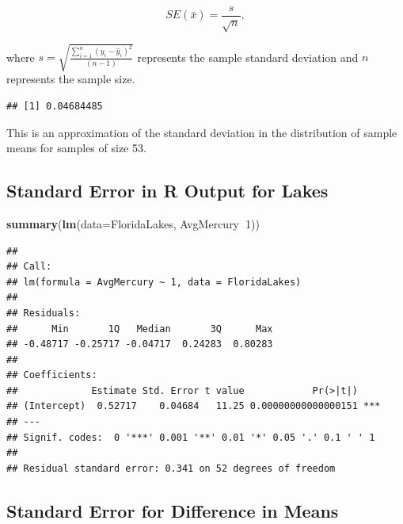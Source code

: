 \documentclass[]{book}
\newenvironment{Shaded}{\begin{snugshade}}{\end{snugshade}}
\newcommand{\KeywordTok}[1]{\textcolor[rgb]{0.13,0.29,0.53}{\textbf{#1}}}
\newcommand{\DataTypeTok}[1]{\textcolor[rgb]{0.13,0.29,0.53}{#1}}
\newcommand{\DecValTok}[1]{\textcolor[rgb]{0.00,0.00,0.81}{#1}}
\newcommand{\OperatorTok}[1]{\textcolor[rgb]{0.81,0.36,0.00}{\textbf{#1}}}
\newcommand{\NormalTok}[1]{#1}
\begin{document}
\[
SE(\bar{x})=\frac{s}{\sqrt{n}}, 
\]

where
\(s=\sqrt{\frac{\displaystyle\sum_{i=1}^n(y_i-\hat{y}_i)^2}{(n-1)}}\)
represents the sample standard deviation and \(n\) represents the sample
size.

\begin{Shaded}
\end{Shaded}

\begin{verbatim}
## [1] 0.04684485
\end{verbatim}

This is an approximation of the standard deviation in the distribution
of sample means for samples of size 53.

\subsection{Standard Error in R Output for
Lakes}\label{standard-error-in-r-output-for-lakes}

\begin{Shaded}
\begin{Highlighting}[]
\KeywordTok{summary}\NormalTok{(}\KeywordTok{lm}\NormalTok{(}\DataTypeTok{data=}\NormalTok{FloridaLakes, AvgMercury}\OperatorTok{~}\DecValTok{1}\NormalTok{))}
\end{Highlighting}
\end{Shaded}

\begin{verbatim}
## 
## Call:
## lm(formula = AvgMercury ~ 1, data = FloridaLakes)
## 
## Residuals:
##      Min       1Q   Median       3Q      Max 
## -0.48717 -0.25717 -0.04717  0.24283  0.80283 
## 
## Coefficients:
##             Estimate Std. Error t value            Pr(>|t|)    
## (Intercept)  0.52717    0.04684   11.25 0.00000000000000151 ***
## ---
## Signif. codes:  0 '***' 0.001 '**' 0.01 '*' 0.05 '.' 0.1 ' ' 1
## 
## Residual standard error: 0.341 on 52 degrees of freedom
\end{verbatim}

\subsection{Standard Error for Difference in
Means}\label{standard-error-for-difference-in-means}
\end{document}
